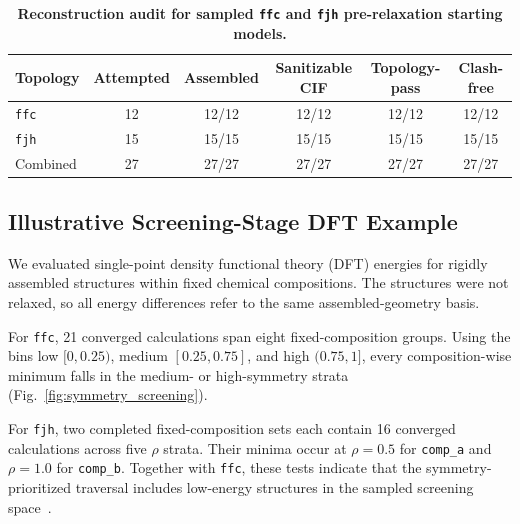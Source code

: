 \documentclass[pdflatex,sn-mathphys-num]{sn-jnl}
\theoremstyle{thmstyleone}%
\begin{document}
\begin{table}[htbp]
\centering
\caption{\textbf{Reconstruction audit for sampled \texttt{ffc} and \texttt{fjh} pre-relaxation starting models.}}
\label{tab:reconstruction_audit}
\begin{tabular}{lccccc}
\toprule
Topology & Attempted & Assembled & Sanitizable CIF & Topology-pass & Clash-free \\
\midrule
\texttt{ffc} & 12 & 12/12 & 12/12 & 12/12 & 12/12 \\
\texttt{fjh} & 15 & 15/15 & 15/15 & 15/15 & 15/15 \\
\midrule
Combined & 27 & 27/27 & 27/27 & 27/27 & 27/27 \\
\bottomrule
\end{tabular}
\end{table}


\subsection*{Illustrative Screening-Stage DFT Example}

We evaluated single-point density functional theory (DFT) energies for rigidly assembled structures within fixed chemical compositions. The structures were not relaxed, so all energy differences refer to the same assembled-geometry basis.

For \texttt{ffc}, 21 converged calculations span eight fixed-composition groups. Using the bins low $[0,0.25)$, medium $[0.25,0.75]$, and high $(0.75,1]$, every composition-wise minimum falls in the medium- or high-symmetry strata (Fig.~\ref{fig:symmetry_screening}).

For \texttt{fjh}, two completed fixed-composition sets each contain 16 converged calculations across five $\rho$ strata. Their minima occur at $\rho=0.5$ for \texttt{comp\_a} and $\rho=1.0$ for \texttt{comp\_b}. Together with \texttt{ffc}, these tests indicate that the symmetry-prioritized traversal includes low-energy structures in the sampled screening space~\cite{peng2024learning,zeni2023mattergen,okabe2025structural}.
\end{document}
